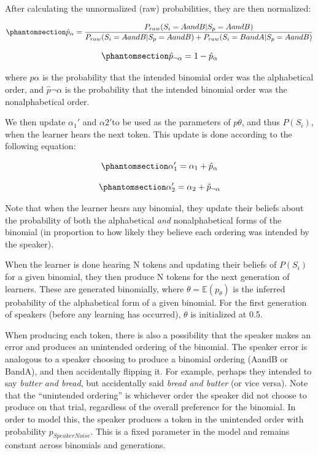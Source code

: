 \documentclass[
  12pt,
  letterpaper,
]{scrreport}
\begin{document}
After calculating the unnormalized (raw) probabilities, they are then
normalized:

\begin{equation}\phantomsection\label{eq-phatalpha}{
\hat{p}_{\alpha} = \frac{P_{raw}(S_i = AandB|S_p = AandB)}{P_{raw}(S_i = AandB | S_p = AandB) + P_{raw}(S_i = BandA|S_p = AandB)}
}\end{equation}

\begin{equation}\phantomsection\label{eq-phatnotalpha}{
\hat{p}_{\neg\alpha} = 1 - \hat{p}_\alpha
}\end{equation}

\noindent where \(\hat{p}\alpha\) is the probability that the intended
binomial order was the alphabetical order, and \(\hat{p}{\neg\alpha}\)
is the probability that the intended binomial order was the
nonalphabetical order.

We then update \(\alpha_1'\) and \(\alpha2'\)to be used as the
parameters of \(p\theta\), and thus \(P(S_i)\), when the learner hears
the next token. This update is done according to the following equation:

\begin{equation}\phantomsection\label{eq-alpha1prime}{
\alpha_1' = \alpha_1 + \hat{p}_\alpha
}\end{equation}

\begin{equation}\phantomsection\label{eq-alpha2prime}{
\alpha_2' = \alpha_2 + \hat{p}_{\neg\alpha}
}\end{equation}

Note that when the learner hears any binomial, they update their beliefs
about the probability of both the alphabetical \emph{and}
nonalphabetical forms of the binomial (in proportion to how likely they
believe each ordering was intended by the speaker).

When the learner is done hearing N tokens and updating their beliefs of
\(P(S_i)\) for a given binomial, they then produce N tokens for the next
generation of learners. These are generated binomially, where
\(\theta = \mathbb{E}(p_\theta)\) is the inferred probability of the
alphabetical form of a given binomial. For the first generation of
speakers (before any learning has occurred), \(\theta\) is initialized
at 0.5.

When producing each token, there is also a possibility that the speaker
makes an error and produces an unintended ordering of the binomial. The
speaker error is analogous to a speaker choosing to produce a binomial
ordering (AandB or BandA), and then accidentally flipping it. For
example, perhaps they intended to say \emph{butter and bread}, but
accidentally said \emph{bread and butter} (or vice versa). Note that the
``unintended ordering'' is whichever order the speaker did not choose to
produce on that trial, regardless of the overall preference for the
binomial. In order to model this, the speaker produces a token in the
unintended order with probability \(p_{SpeakerNoise}\). This is a fixed
parameter in the model and remains constant across binomials and
generations.
\end{document}
